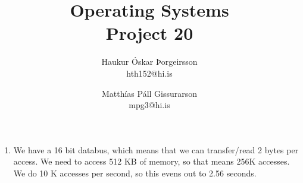 \documentclass[a4]{article}
\title{Operating Systems\\
Project 20}
\author{           
    Haukur Óskar Þorgeirsson\\
    hth152@hi.is \and
    Matthías Páll Gissurarson\\
    mpg3@hi.is
}
\begin{document}
\maketitle

\begin{enumerate}
\item We have a 16 bit databus, which means that we can transfer/read 2 bytes per access. We need to access 512 KB of memory, so that means 256K accesses. We do 10 K accesses per second, so this evens out to 2.56 seconds.
\end{enumerate}
\end{document}
